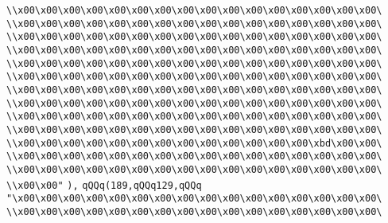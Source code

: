 \verb|\\x00\x00\x00\x00\x00\x00\x00\x00\x00\x00\x00\x00\x00\x00\x00\x00\|\newline
\verb|\\x00\x00\x00\x00\x00\x00\x00\x00\x00\x00\x00\x00\x00\x00\x00\x00\|\newline
\verb|\\x00\x00\x00\x00\x00\x00\x00\x00\x00\x00\x00\x00\x00\x00\x00\x00\|\newline
\verb|\\x00\x00\x00\x00\x00\x00\x00\x00\x00\x00\x00\x00\x00\x00\x00\x00\|\newline
\verb|\\x00\x00\x00\x00\x00\x00\x00\x00\x00\x00\x00\x00\x00\x00\x00\x00\|\newline
\verb|\\x00\x00\x00\x00\x00\x00\x00\x00\x00\x00\x00\x00\x00\x00\x00\x00\|\newline
\verb|\\x00\x00\x00\x00\x00\x00\x00\x00\x00\x00\x00\x00\x00\x00\x00\x00\|\newline
\verb|\\x00\x00\x00\x00\x00\x00\x00\x00\x00\x00\x00\x00\x00\x00\x00\x00\|\newline
\verb|\\x00\x00\x00\x00\x00\x00\x00\x00\x00\x00\x00\x00\x00\x00\x00\x00\|\newline
\verb|\\x00\x00\x00\x00\x00\x00\x00\x00\x00\x00\x00\x00\x00\x00\x00\x00\|\newline
\verb|\\x00\x00\x00\x00\x00\x00\x00\x00\x00\x00\x00\x00\x00\xbd\x00\x00\|\newline
\verb|\\x00\x00\x00\x00\x00\x00\x00\x00\x00\x00\x00\x00\x00\x00\x00\x00\|\newline
\verb|\\x00\x00\x00\x00\x00\x00\x00\x00\x00\x00\x00\x00\x00\x00\x00\x00\|\newline
\verb|\\x00\x00"|\newline
\verb|),|\newline
\verb|qQQq(189,qQQq129,qQQq|\newline
\verb|"\x00\x00\x00\x00\x00\x00\x00\x00\x00\x00\x00\x00\x00\x00\x00\x00\|\newline
\verb|\\x00\x00\x00\x00\x00\x00\x00\x00\x00\x00\x00\x00\x00\x00\x00\x00\|\newline
